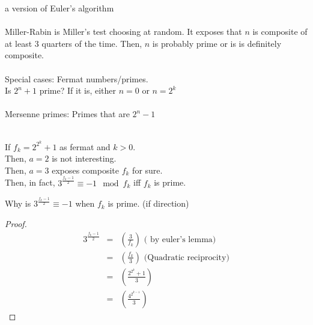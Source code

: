   a version of Euler's algorithm\\\\
  Miller-Rabin is Miller's test choosing at random. It exposes that $n$ is
  composite of at least 3 quarters of the time. Then, $n$ is probably prime
  or is is definitely composite.\\\\
  Special cases: Fermat numbers/primes.\\
    Is $2^n + 1$ prime? If it is, either $n = 0$ or $n = 2^k$\\\\
  Mersenne primes: Primes that are $2^n - 1$\\\\
  \begin{theorem}
    If $f_k = 2^{2^k} + 1$ as fermat and $k > 0$.\\
    Then, $a = 2$ is not interesting.\\
    Then, $a = 3$ exposes composite $f_k$ for sure.\\
    Then, in fact, $3^{\frac{f_k - 1}{2}} \equiv -1 \mod f_k$ iff $f_k$ is
    prime.
  \end{theorem}
  Why is $3^{\frac{f_k - 1}{2}} \equiv -1$ when $f_k$ is prime. (if direction)
  \begin{proof}
    \begin{eqnarray*}
      3^{\frac{f_k-1}{2}} &=& (\frac{3}{f_k}) \text{ ( by euler's lemma)}\\
      & = & (\frac{f_k}{3}) \text{ (Quadratic reciprocity)}\\
      & = & (\frac{2^{2^k} + 1}{3}) \\
      & = & (\frac{4^{2^{k-1}}}{3})
    \end{eqnarray*}
  \end{proof}
